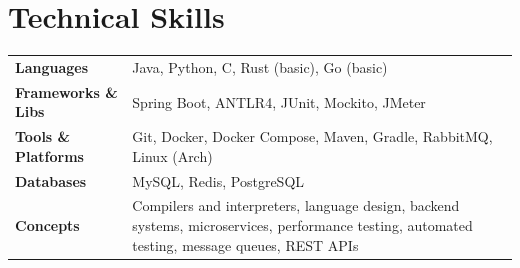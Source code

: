 \documentclass[10pt]{article}
\begin{document}
\section{Technical Skills}
\begin{tabular}{@{}>{\bfseries}p{4.1cm}@{}p{\dimexpr\linewidth-4.1cm\relax}@{}}
  Languages          & Java, Python, C, Rust (basic), Go (basic) \\[2pt]
  Frameworks \& Libs & Spring Boot, ANTLR4, JUnit, Mockito, JMeter \\[2pt]
  Tools \& Platforms & Git, Docker, Docker Compose, Maven, Gradle, RabbitMQ, Linux (Arch) \\[2pt]
  Databases          & MySQL, Redis, PostgreSQL \\[2pt]
  Concepts           & Compilers and interpreters, language design, backend systems, microservices, performance testing, automated testing, message queues, REST APIs \\
\end{tabular}
\end{document}
